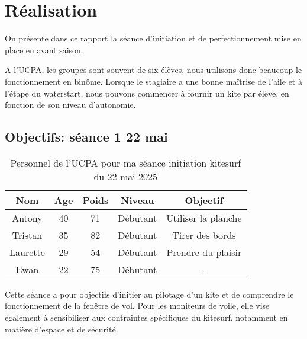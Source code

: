 \documentclass[11pt,a4paper]{report}
\begin{document}
\FloatBarrier
\section{Réalisation}
On présente dans ce rapport la séance d'initiation et de perfectionnement
mise en place en avant saison.

A l'UCPA, les groupes sont souvent de six élèves, nous
utilisons donc beaucoup le fonctionnement en bin\^ome. 
Lorsque le stagiaire a une bonne maîtrise de l'aile et
à l'étape du waterstart, nous pouvons commencer à fournir
un kite par élève, en fonction de son niveau d'autonomie.
\subsection{Objectifs: séance 1 22 mai}
\begin{table}[h]
\centering
\begin{tabular}{|c|c|c|c|c|}
        \hline
        \textbf{Nom} & \textbf{Age} & \textbf{Poids}& \textbf{Niveau}     &  \textbf{Objectif} \\ 
        \hline
        Antony        &  40          &  71           &   Débutant          & Utiliser la planche  \\
        Tristan       &  35          & 82            &  Débutant           & Tirer des bords  \\
        Laurette      &  29          & 54            &  Débutant           & Prendre du plaisir \\
        Ewan          &  22          & 75            & Débutant            &  -  \\
        \hline
\end{tabular}
\caption{Personnel de l'UCPA pour ma séance initiation kitesurf du 22 mai 2025\label{stagiaires_table}}
\end{table}
Cette séance a pour objectifs d’initier au pilotage d’un kite et
de comprendre le fonctionnement de la fenêtre de vol. 
Pour les moniteurs de voile, elle vise également à 
sensibiliser aux contraintes spécifiques du kitesurf, 
notamment en matière d’espace et de sécurité.
 
\end{document}
